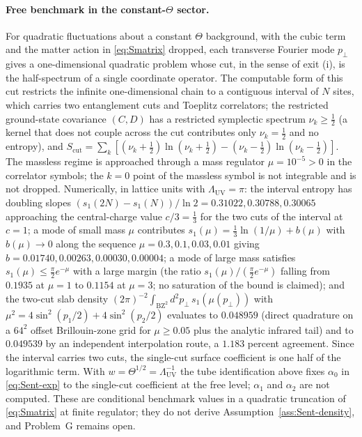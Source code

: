 \paragraph{Free benchmark in the constant-\(\Theta\) sector.}
For quadratic fluctuations about a constant \(\Theta\) background, with the
cubic term and the matter action in \eqref{eq:Smatrix} dropped, each transverse
Fourier mode \(p_\perp\) gives a one-dimensional quadratic problem whose cut,
in the sense of exit (i), is the half-spectrum of a single coordinate operator.
The computable form of this cut restricts the infinite one-dimensional chain to
a contiguous interval of \(N\) sites, which carries two entanglement cuts and
Toeplitz correlators; the restricted ground-state covariance \((C,D)\) has a
restricted symplectic spectrum \(\nu_k\ge\tfrac12\) (a kernel that does not
couple across the cut contributes only \(\nu_k=\tfrac12\) and no entropy), and
\(S_{\mathrm{cut}}=\sum_k[(\nu_k+\tfrac12)\ln(\nu_k+\tfrac12)-(\nu_k-\tfrac12)\ln(\nu_k-\tfrac12)]\).
The massless regime is approached through a mass regulator \(\mu=10^{-5}>0\) in
the correlator symbols; the \(k=0\) point of the massless symbol is not
integrable and is not dropped. Numerically, in lattice units with
\(\Lambda_{\mathrm{UV}}=\pi\): the interval entropy has doubling slopes
\((s_1(2N)-s_1(N))/\ln 2=0.31022,0.30788,0.30065\) approaching the
central-charge value \(c/3=\tfrac13\) for the two cuts of the interval at
\(c=1\); a mode of small mass \(\mu\) contributes
\(s_1(\mu)=\tfrac13\ln(1/\mu)+b(\mu)\) with \(b(\mu)\to0\) along the sequence
\(\mu=0.3,0.1,0.03,0.01\) giving \(b=0.01740,0.00263,0.00030,0.00004\); a mode
of large mass satisfies \(s_1(\mu)\le\tfrac\pi2 e^{-\mu}\) with a large margin
(the ratio \(s_1(\mu)/(\tfrac\pi2 e^{-\mu})\) falling from \(0.1935\) at
\(\mu=1\) to \(0.1154\) at \(\mu=3\); no saturation of the bound is claimed);
and the two-cut slab density
\((2\pi)^{-2}\int_{\mathrm{BZ}^2}d^2p_\perp\,s_1(\mu(p_\perp))\) with
\(\mu^2=4\sin^2(p_1/2)+4\sin^2(p_2/2)\) evaluates to \(0.048959\) (direct
quadrature on a \(64^2\) offset Brillouin-zone grid for \(\mu\ge0.05\) plus the
analytic infrared tail) and to \(0.049539\) by an independent interpolation
route, a \(1.183\) percent agreement. Since the interval carries two cuts, the
single-cut surface coefficient is one half of the logarithmic term. With
\(w=\Theta^{1/2}=\Lambda_{\mathrm{UV}}^{-1}\) the tube identification above
fixes \(\alpha_0\) in \eqref{eq:Sent-exp} to the single-cut coefficient at the
free level; \(\alpha_1\) and \(\alpha_2\) are not computed. These are
conditional benchmark values in a quadratic truncation of \eqref{eq:Smatrix} at
finite regulator; they do not derive Assumption~\ref{ass:Sent-density}, and
Problem~G remains open.


